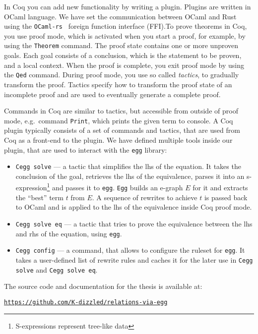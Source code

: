 In Coq you can add new functionality by writing a plugin. Plugins are written in OCaml language. We have set the communication between OCaml and Rust using the \texttt{OCaml-rs}~\cite{OCaml_rust_ffi} foreign function interface (FFI).\@ To prove theorems in Coq, you use proof mode, which is activated when you start a proof, for example, by using the \texttt{Theorem} command. The proof state contains one or more unproven goals. Each goal consists of a conclusion, which is the statement to be proven, and a local context. When the proof is complete, you exit proof mode by using the \texttt{Qed} command. During proof mode, you use so called \textit{tactics}, to gradually transform the proof. Tactics specify how to transform the proof state of an incomplete proof and are used to eventually generate a complete proof.

Commands in Coq are similar to tactics, but accessible from outside of proof mode, e.g.\ command \texttt{Print}, which prints the given term to console. A Coq plugin typically consists of a set of commands and tactics, that are used from Coq as a front-end to the plugin. 
We have defined multiple tools inside our plugin, that are used to interact with the \texttt{egg} library: 
\begin{itemize}
    \item \texttt{Cegg solve} --- a tactic that simplifies the lhs of the equation. It takes the conclusion of the goal, retrieves the lhs of the equivalence, parses it into an s-expression\footnote{S-expressions represent tree-like data} and passes it to \texttt{egg}. \texttt{Egg} builds an e-graph $E$ for it and extracts the ``best'' term $t$ from $E$. A sequence of rewrites to achieve $t$ is passed back to OCaml and is applied to the lhs of the equivalence inside Coq proof mode. 
    \item \texttt{Cegg solve eq} --- a tactic that tries to prove the equivalence between the lhs and rhs of the equation, using \texttt{egg}. 
    \item \texttt{Cegg config} --- a command, that allows to configure the ruleset for \texttt{egg}. It takes a user-defined list of rewrite rules and caches it for the later use in \texttt{Cegg solve} and \texttt{Cegg solve eq}.
\end{itemize}
The source code and documentation for the thesis is available at:
\begin{center}
    \href{https://github.com/K-dizzled/relations-via-egg}{\texttt{https://github.com/K-dizzled/relations-via-egg}}
\end{center}

